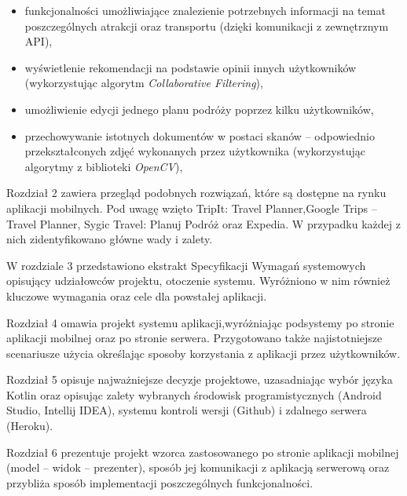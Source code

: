 \documentclass[10pt,twoside,a4paper]{report}
\begin{document}
\begin{itemize}

\item funkcjonalności umożliwiające znalezienie potrzebnych informacji na temat poszczególnych atrakcji oraz transportu (dzięki komunikacji z zewnętrznym API),

\item  wyświetlenie rekomendacji na podstawie opinii innych użytkowników (wykorzystując algorytm \textit{Collaborative Filtering}),

\item umożliwienie edycji jednego planu podróży poprzez kilku użytkowników,

\item przechowywanie istotnych dokumentów w postaci skanów – odpowiednio przekształconych zdjęć wykonanych przez użytkownika (wykorzystując algorytmy z biblioteki \textit{OpenCV}),

\end{itemize}

\par Rozdział 2 zawiera przegląd podobnych rozwiązań, które są dostępne na rynku aplikacji mobilnych. Pod uwagę wzięto TripIt: Travel Planner,Google Trips -- Travel Planner, Sygic Travel: Planuj Podróż oraz Expedia. W przypadku każdej z nich zidentyfikowano główne wady i zalety.

\par W rozdziale 3 przedstawiono ekstrakt Specyfikacji Wymagań systemowych opisujący udziałowców projektu, otoczenie systemu. Wyróżniono w nim również kluczowe wymagania oraz cele dla powstałej aplikacji.

\par Rozdział 4 omawia projekt systemu aplikacji,wyróżniając podsystemy po stronie aplikacji mobilnej oraz po stronie serwera. Przygotowano także najistotniejsze scenariusze użycia określając sposoby korzystania z aplikacji przez użytkowników.

\par Rozdział 5 opisuje najważniejsze decyzje projektowe, uzasadniając wybór języka Kotlin oraz opisując zalety wybranych środowisk programistycznych (Android Studio, Intellij IDEA), systemu kontroli wersji (Github) i zdalnego serwera (Heroku). 

\par Rozdział 6 prezentuje projekt wzorca zastosowanego po stronie aplikacji mobilnej (model -- widok -- prezenter), sposób jej komunikacji z aplikacją serwerową oraz przybliża sposób implementacji poszczególnych funkcjonalności.
\end{document}

